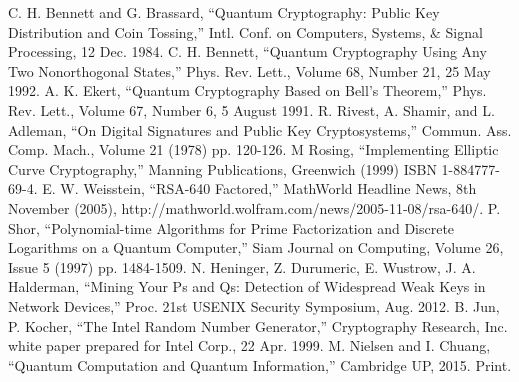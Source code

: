 \documentclass[conference]{IEEEtran}
\begin{document}
\begin{thebibliography}{10}
  C. H. Bennett and G. Brassard, ``Quantum Cryptography: Public Key Distribution and Coin Tossing,'' Intl. Conf. on Computers, Systems, \& Signal Processing, 12 Dec. 1984.
  C. H. Bennett, ``Quantum Cryptography Using Any Two Nonorthogonal States,'' Phys. Rev. Lett., Volume 68, Number 21, 25 May 1992.
  A. K. Ekert, ``Quantum Cryptography Based on Bell's Theorem,'' Phys. Rev. Lett., Volume 67, Number 6, 5 August 1991.
  R. Rivest, A. Shamir, and L. Adleman, ``On Digital Signatures and Public Key Cryptosystems,'' Commun. Ass. Comp. Mach., Volume 21 (1978) pp. 120-126.
  M Rosing, ``Implementing Elliptic Curve Cryptography,'' Manning Publications, Greenwich (1999) ISBN 1-884777-69-4.
  E. W. Weisstein, ``RSA-640 Factored,'' MathWorld Headline News, 8th November (2005),
  http://mathworld.wolfram.com/news/2005-11-08/rsa-640/.
  P. Shor, ``Polynomial-time Algorithms for Prime Factorization and Discrete Logarithms on a Quantum Computer,'' Siam Journal on Computing, Volume 26, Issue 5 (1997) pp. 1484-1509.
  N. Heninger, Z. Durumeric, E. Wustrow, J. A. Halderman, ``Mining Your Ps and Qs: Detection of Widespread Weak Keys in Network Devices,'' Proc. 21st USENIX Security Symposium, Aug. 2012.
  B. Jun, P. Kocher, ``The Intel Random Number Generator,'' Cryptography Research, Inc. white paper prepared for Intel Corp., 22 Apr. 1999.
  M. Nielsen and I. Chuang, ``Quantum Computation and Quantum Information,'' Cambridge UP, 2015. Print.
\end{thebibliography}




\end{document}
